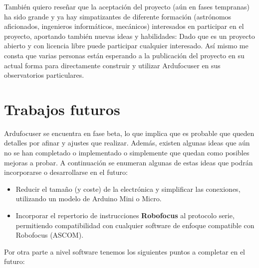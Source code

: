 También quiero reseñar que la aceptación del proyecto (aún en fases tempranas) ha sido grande y ya hay 
simpatizantes de diferente formación (astrónomos aficionados, ingenieros informáticos, mecánicos) interesados en participar en el proyecto, aportando también nuevas ideas y habilidades: Dado que es un proyecto abierto y con licencia libre puede participar cualquier interesado. Así mismo me consta que varias personas están esperando a la publicación del proyecto en su actual forma para directamente construir y utilizar Ardufocuser en sus observatorios particulares.



\section{Trabajos futuros}

Ardufocuser se encuentra en fase beta, lo que implica que es probable que queden detalles por afinar y ajustes que realizar. Además, existen algunas ideas que aún no se han completado o implementado o simplemente que quedan como posibles mejoras a probar. A continuación se enumeran algunas de estas ideas que podrán incorporarse o desarrollarse en el futuro:

\begin{itemize}
	\item Reducir el tamaño (y coste) de la electrónica y simplificar las conexiones, utilizando un modelo de Arduino Mini o Micro.
	
	\item Incorporar el repertorio de instrucciones \textbf{Robofocus} al protocolo serie, permitiendo compatibilidad con cualquier software de enfoque compatible con Robofocus (ASCOM).
\end{itemize}


Por otra parte a nivel software tenemos los siguientes puntos a completar en el futuro:

